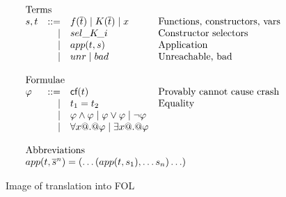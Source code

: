 \documentclass[preprint,nocopyrightspace]{sigplanconf}
\begin{document}
\begin{figure}
\[\begin{array}{c} 
\begin{array}{lrll}
\multicolumn{3}{l}{\text{Terms}} \\
  s,t & ::=  & f(\ol{t}) \mid K(\ol{t}) \mid x & \text{Functions, constructors, vars} \\
      & \mid & \sel{K}{i}                      & \text{Constructor selectors} \\ 
      & \mid & app(t,s)                        & \text{Application} \\
      & \mid & \unr \mid \bad                  & \text{Unreachable, bad} \\ \\ 
\multicolumn{3}{l}{\text{Formulae}} \\ 
 \phi & ::=  & \lcf{t}    & \text{Provably cannot cause crash} \\
      & \mid & t_1 = t_2  & \text{Equality} \\ 
      & \mid & \phi \land \phi \mid \phi \lor \phi \mid \neg \phi \\
      & \mid & \forall x @.@ \phi \mid \exists x @.@ \phi \\ \\ 
\multicolumn{3}{l}{\text{Abbreviations}} \\ 
\multicolumn{4}{l}{app(t,\oln{s}{n}) = (\ldots(app(t,s_1),\ldots s_n)\ldots)}
\end{array}
\end{array}\]
\caption{Image of translation into FOL}\label{fig:fol-image}
\end{figure}

\newcommand{\elab}[1]{\rightsquigarrow \formula{#1}}
\end{document}
